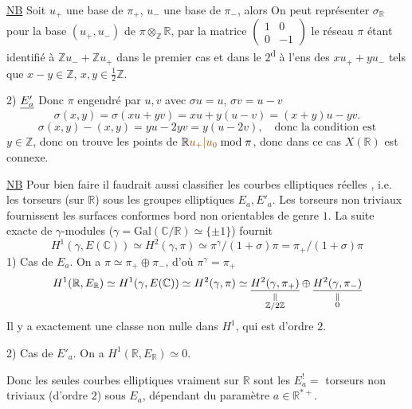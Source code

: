 \uline{NB} Soit $u_+$ une base de $\pi_+$, $u_-$ une base de $\pi_-$, alors
 On peut représenter $\sigma_{\mathbb R}$ pour la base $(u_+,u_-)$ de $\pi\otimes_{\mathbb Z}\mathbb R$,
par la matrice $\begin{pmatrix}1&0\\0&-1\end{pmatrix}$ le réseau $\pi$ étant identifié
à $\mathbb Z u_-+\mathbb Z u_+$  dans le premier cas et dans le $2$\textsuperscript{d}
à l'ens des $xu_++yu_-$ tels que $x-y\in\mathbb Z$, $x,y\in\frac12\mathbb Z$.

2) $\uline{E'_a}$ Donc $\pi$ engendré par $u,v$ avec $\sigma u=u$, $\sigma v=u-v$
\[\sigma(x,y)=\sigma(xu+yv)=xu+y(u-v)=(x+y)u-yv.\]
\[\sigma(x,y)-(x,y)=yu-2yv=y(u-2v),\quad\text{donc la condition est}\]
$y\in\mathbb Z$, donc on trouve  les points de $\mathbb R\unsure{u_+|u_0}\bmod\pi$,
donc dans ce cas $X(\mathbb R)$ est connexe.

\uline{NB} Pour bien faire il faudrait aussi classifier les
courbes elliptiques réelles , i.e. les
torseurs (sur $\mathbb R$) sous les  groupes elliptiques
$E_a,E'_a$. Les torseurs non triviaux fournissent les
surfaces conformes  bord non orientables de
genre $1$. La suite exacte de $\gamma$-modules ($\gamma=\mathrm{Gal}(\mathbb C/\mathbb R)\simeq\{\pm1\}$)
fournit
\[
H^1(\gamma,E(\mathbb C))\simeq H^2(\gamma,\pi)\simeq
\pi^\gamma/(1+\sigma)\pi=\pi_+/(1+\sigma)\pi
\]
1) Cas de $E_a$. On a $\pi\simeq\pi_+\oplus\pi_-$, d'où $\pi^\gamma=\pi_+$
\[
H^1(\mathbb R,E_{\mathbb R})\simeq H^1(\gamma,E(\mathbb C))\simeq H^2(\gamma,\pi)
\simeq\underset{\substack{\Vert\\\mathbb Z/2\mathbb Z}}{\uline{H^2(\gamma,\pi_+)}}
\oplus\underset{\substack{\Vert\\0}}{\uline{H^2(\gamma,\pi_-)}}
\]
Il y a exactement une classe non
nulle dans $H^1$, qui est d'ordre $2$.

2) Cas de $E'_a$. On a $H^1(\mathbb R,E_{\mathbb R})\simeq0$.

Donc les seules courbes elliptiques vraiment
 sur $\mathbb R$ sont les $E_a^!=$ torseurs non
triviaux (d'ordre $2$) sous $E_a$, dépendant du
paramètre $a\in\mathbb R^{*+}$.
